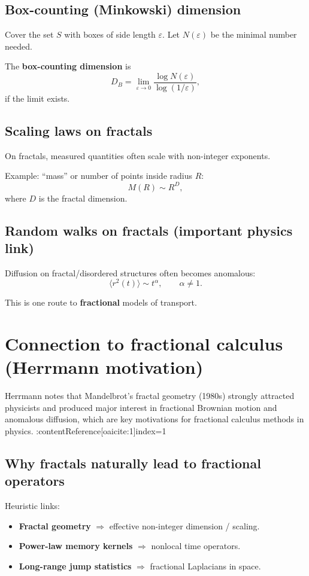 \subsection{Box-counting (Minkowski) dimension}
Cover the set $S$ with boxes of side length $\varepsilon$.
Let $N(\varepsilon)$ be the minimal number needed.

The \textbf{box-counting dimension} is
\begin{equation}
D_B = \lim_{\varepsilon\to 0}\frac{\log N(\varepsilon)}{\log(1/\varepsilon)},
\end{equation}
if the limit exists.

\subsection{Scaling laws on fractals}
On fractals, measured quantities often scale with non-integer exponents.

Example: ``mass'' or number of points inside radius $R$:
\begin{equation}
M(R)\sim R^{D},
\end{equation}
where $D$ is the fractal dimension.

\subsection{Random walks on fractals (important physics link)}
Diffusion on fractal/disordered structures often becomes anomalous:
\begin{equation}
\langle r^2(t)\rangle \sim t^\alpha,
\qquad \alpha\neq 1.
\end{equation}

This is one route to \textbf{fractional} models of transport.


\section{Connection to fractional calculus (Herrmann motivation)}

Herrmann notes that Mandelbrot's fractal geometry (1980s) strongly attracted physicists
and produced major interest in fractional Brownian motion and anomalous diffusion,
which are key motivations for fractional calculus methods in physics. :contentReference[oaicite:1]{index=1}

\subsection{Why fractals naturally lead to fractional operators}
Heuristic links:
\begin{itemize}
\item \textbf{Fractal geometry} $\Rightarrow$ effective non-integer dimension / scaling.
\item \textbf{Power-law memory kernels} $\Rightarrow$ nonlocal time operators.
\item \textbf{Long-range jump statistics} $\Rightarrow$ fractional Laplacians in space.
\end{itemize}

